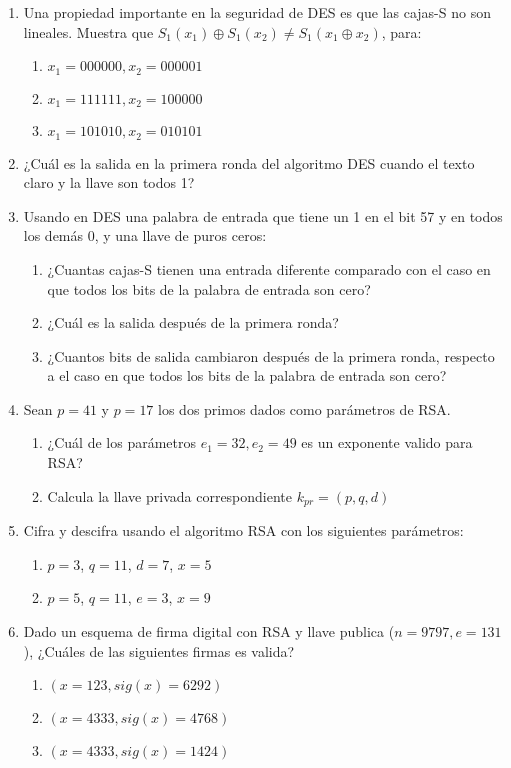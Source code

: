 \documentclass[12pt]{article}
\begin{document}
\begin{enumerate}

\item Una propiedad importante en la seguridad de DES es que las cajas-S no son lineales.
Muestra que $S_1(x_1) \oplus S_1(x_2)  \ne S_1(x_1 \oplus x_2) $, para:
\begin{enumerate}
\item $x_1 = 000000, x_2 = 000001$
\item $x_1 = 111111, x_2 = 100000$
\item $x_1 = 101010, x_2 = 010101$
\end{enumerate}

\item ¿Cuál es la salida en la primera ronda del algoritmo DES cuando el texto claro y la llave son todos 1?

\item Usando en DES una palabra de entrada que tiene un 1 en el bit 57 y en todos los demás 0, y una llave de puros ceros:
\begin{enumerate}
\item ¿Cuantas cajas-S tienen una entrada diferente comparado con el caso en que todos los bits de la palabra de entrada   son cero?
\item ¿Cuál es la salida después de la primera ronda?
\item ¿Cuantos bits de salida cambiaron después de la primera ronda,  respecto a el caso en que todos los bits de la palabra de entrada son cero?
\end{enumerate}

\item Sean $p = 41$ y $p = 17$ los dos primos dados como parámetros de RSA.
\begin{enumerate}
\item ¿Cuál de los parámetros $e_1 = 32, e_2 = 49$ es un exponente valido para RSA?
\item Calcula la llave privada correspondiente $k_{pr} = (p, q, d)$
\end{enumerate}

\item Cifra y descifra usando el algoritmo RSA con los siguientes parámetros:
\begin{enumerate}
\item $p = 3$, $q = 11$, $d =  7$, $x = 5$
\item $p = 5$, $q = 11$, $e =  3$, $x = 9$
\end{enumerate}

\item Dado un esquema de firma digital con RSA y llave publica ($n = 9797, e = 131$), ¿Cuáles de las siguientes firmas
es valida?
\begin{enumerate}
\item $(x = 123, sig(x) = 6292)$
\item $(x = 4333, sig(x) = 4768)$
\item $(x = 4333, sig(x) = 1424)$
\end{enumerate}


\end{enumerate}
\end{document}
